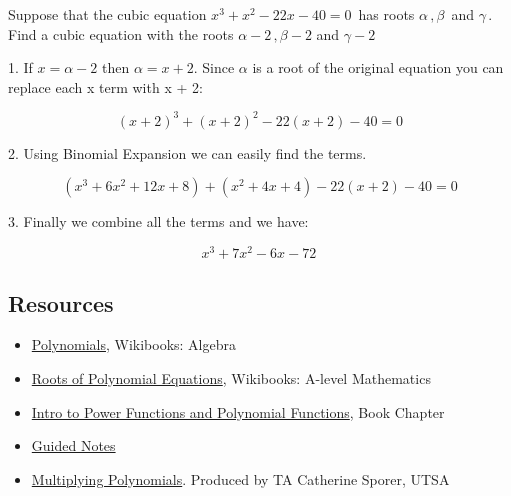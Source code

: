 Suppose that the cubic equation $x^3+x^2-22x-40 = 0\,$ has roots $\alpha\,, \beta\,$ and
$\gamma\,$. Find a cubic equation with the roots $\alpha - 2\,, \beta- 2$ and $\gamma
-2\,$



1.  If $x=\alpha-2$ then $\alpha=x+2$. Since $\alpha$ is a root of the original equation
you can replace each x term with x + 2:

    $$\left(x+2\right)^3+\left(x+2\right)^2-22\left(x+2\right)-40 = 0$$

2.  Using Binomial Expansion we can easily find the terms.

    $$\left(x^3+6x^2 + 12x + 8\right)+\left(x^2+4x+4\right)-22\left(x+2\right)-40 = 0$$

3.  Finally we combine all the terms and we have:



$$x^3 + 7x^2 -6x -72\,$$




\subsection{Resources}
\label{sss:reso-55b5}




\begin{itemize}
    \item \href{https://en.wikibooks.org/wiki/Algebra/Polynomials}{Polynomials}, Wikibooks: Algebra
    \item \href{https://en.wikibooks.org/wiki/A-level_Mathematics/OCR/FP1/Roots_of_Polynomial_Equations}{Roots of Polynomial Equations}, Wikibooks: A-level Mathematics
    \item \href{https://mathresearch.utsa.edu/wikiFiles/MAT1053/Intro_to_Polynomial_and_Power_Functions/MAT1053_M2.1Intro_to_Power_Functions_and_Polynomial_Functions.pdf}{Intro to Power Functions and Polynomial Functions}, Book Chapter
    \item \href{https://mathresearch.utsa.edu/wikiFiles/MAT1053/Intro_to_Polynomial_and_Power_Functions/MAT1053_M2.1Intro_to_Power_Functions_and_Polynomial_FunctionsGN.pdf}{Guided Notes}
    \item \href{https://www.youtube.com/watch?v=nJLzFBsSX3o}{Multiplying Polynomials}. Produced by TA Catherine Sporer, UTSA
\end{itemize}


